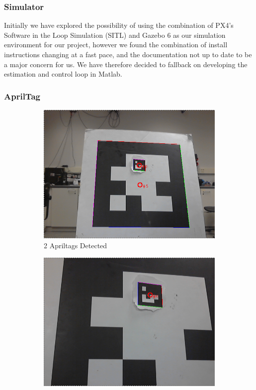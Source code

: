 \documentclass{article}[12pt]
\begin{document}
\subsubsection*{Simulator}
Initially we have explored the possibility of using the combination of PX4's 
Software in the Loop Simulation (SITL) and Gazebo 6 as our simulation 
environment for our project, however we found the combination of install 
instructions changing at a fast pace, and the documentation not up to date to 
be a major concern for us. We have therefore decided to fallback on developing 
the estimation and control loop in Matlab.

\subsubsection*{AprilTag}
\begin{figure}[H]
	\centering
	\begin{subfigure}[b]{0.45\linewidth}
		\includegraphics[width=\textwidth]{images/apriltags_1.png}
		\caption{2 Apriltags Detected}
	\end{subfigure}
	\begin{subfigure}[b]{0.45\linewidth}
		\includegraphics[width=\textwidth]{images/apriltags_3.png}

\end{subfigure}
\end{figure}
\end{document}
